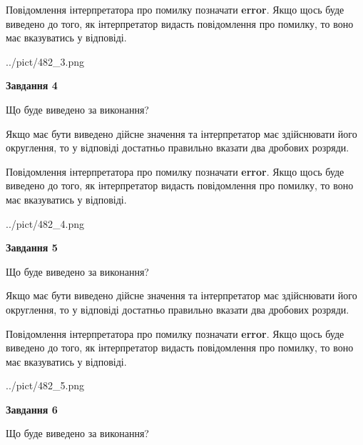 \documentclass[12pt, ukrainian]{article}
\begin{document}
{\begin {Large}
Повідомлення інтерпретатора про помилку позначати \textbf{error}.
Якщо щось буде виведено до того, як інтерпретатор видасть повідомлення про помилку, 
то воно має вказуватись у відповіді. \par

\begin{center}
	{../pict/482_3.png}
\end{center}
\newpage

{\begin {center}\textbf{Завдання 4}\end {center}}\par
Що буде виведено за виконання? \par

Якщо має бути виведено дійсне значення та інтерпретатор має здійснювати його округлення, 
то у відповіді достатньо правильно вказати два дробових розряди.

Повідомлення інтерпретатора про помилку позначати \textbf{error}.
Якщо щось буде виведено до того, як інтерпретатор видасть повідомлення про помилку, 
то воно має вказуватись у відповіді. \par

\begin{center}
	{../pict/482_4.png}
\end{center}
\newpage

{\begin {center}\textbf{Завдання 5}\end {center}}\par
Що буде виведено за виконання? \par

Якщо має бути виведено дійсне значення та інтерпретатор має здійснювати його округлення, 
то у відповіді достатньо правильно вказати два дробових розряди.

Повідомлення інтерпретатора про помилку позначати \textbf{error}.
Якщо щось буде виведено до того, як інтерпретатор видасть повідомлення про помилку, 
то воно має вказуватись у відповіді. \par

\begin{center}
	{../pict/482_5.png}
\end{center}
\newpage

{\begin {center}\textbf{Завдання 6}\end {center}}\par
Що буде виведено за виконання? \par


\end{Large}}
\end{document}
